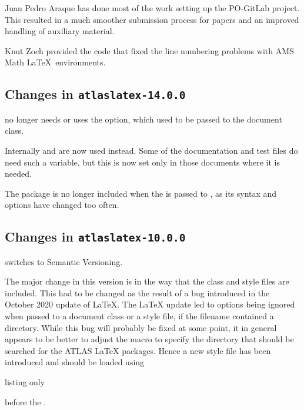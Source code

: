 Juan Pedro Araque has done most of the work setting up the PO-GitLab project.
This resulted in a much smoother submission process for papers and
an improved handling of auxiliary material.

Knut Zoch provided the code that fixed the line numbering problems with AMS Math \LaTeX\ environments.


\subsection{Changes in \texttt{atlaslatex-14.0.0}}
\label{sec:atlaslatex14}

 no longer needs or uses the  option,
which used to be passed to the document class.

Internally  and  are now used instead.
Some of the documentation and test files do need such a variable,
but this is now set only in those documents where it is needed.

The package  is no longer included when the 
is passed to , as its syntax and options have changed too often.


\subsection{Changes in \texttt{atlaslatex-10.0.0}}
\label{sec:atlaslatex10}

 switches to Semantic Versioning.

The major change in this version is in the way that the class and style files are included.
This had to be changed as the result of a bug introduced in the October 2020 update of \LaTeX.
The \LaTeX{} update led to options being ignored when passed to a document class or a style file,
if the filename contained a directory.
While this bug will probably be fixed at some point,
it in general appears to be better to adjust the macro 
to specify the directory that should be searched for the ATLAS \LaTeX{} packages.
Hence a new style file  has been introduced and should be loaded using
\begin{tcblisting}{listing only}
\RequirePackage{latex/atlaslatexpath}
\end{tcblisting}
before the .

